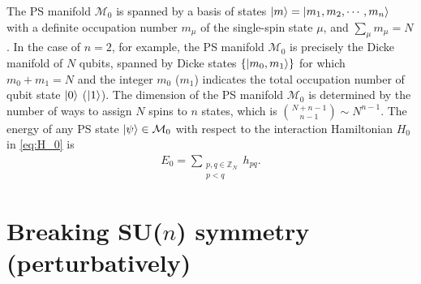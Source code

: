 \documentclass[nofootinbib,notitlepage,11pt]{revtex4-2}
\newcommand{\p}[1]{\left(#1\right)} %
\renewcommand{\set}[1]{\left\{#1\right\}} %
\newcommand{\1}{\mathds{1}}
\newcommand{\M}{\mathcal{M}}
\newcommand{\ZZ}{\mathbb{Z}}
\begin{document}
The PS manifold $\M_0$ is spanned by a basis of states
$\ket{m}=\ket{m_1,m_2,\cdots,m_n}$ with a definite occupation number
$m_\mu$ of the single-spin state $\mu$, and $\sum_\mu m_\mu=N$.  In
the case of $n=2$, for example, the PS manifold $\M_0$ is precisely
the Dicke manifold\cite{dicke1954coherence} of $N$ qubits, spanned by
Dicke states $\set{\ket{m_0,m_1}}$ for which $m_0+m_1=N$ and the
integer $m_0$ ($m_1$) indicates the total occupation number of qubit
state $\ket{0}$ ($\ket{1}$).  The dimension of the PS manifold $\M_0$
is determined by the number of ways to assign $N$ spins to $n$ states,
which is ${N+n-1 \choose n-1}\sim N^{n-1}$.  The energy of any PS
state $\ket\psi\in\M_0$ with respect to the interaction Hamiltonian
$H_0$ in \eqref{eq:H_0} is
\begin{align}
  E_0 = \sum_{\substack{p,q\in\ZZ_N\\p<q}} h_{pq}.
\end{align}

\section{Breaking SU($n$) symmetry (perturbatively)}
\label{eq:pert_theory}
\end{document}
